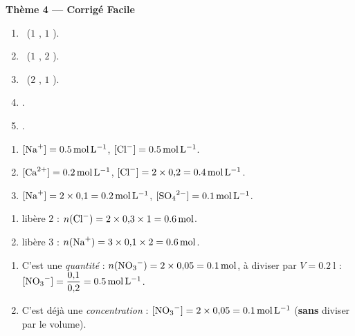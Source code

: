 \documentclass[11pt,a4paper]{article}
\begin{document}
\begin{center}{\large\bfseries\color{primarydark} Thème 4 — Corrigé Facile}\end{center}

\begin{corrige}
\begin{enumerate}[label=\alph*)]
  \item {} \ ($1$ , $1$ ).
  \item {} \ ($1$ , $2$ ).
  \item {} \ ($2$ , $1$ ).
  \item {}.
  \item {}.
\end{enumerate}
\end{corrige}

\begin{corrige}
\begin{enumerate}[label=\alph*)]
  \item $[\ce{Na+}] = \SI{0.5}{\mole\per\litre}$, $[\ce{Cl-}] = \SI{0.5}{\mole\per\litre}$.
  \item $[\ce{Ca^2+}] = \SI{0.2}{\mole\per\litre}$, $[\ce{Cl-}] = 2\times 0{,}2 = \SI{0.4}{\mole\per\litre}$.
  \item $[\ce{Na+}] = 2\times 0{,}1 = \SI{0.2}{\mole\per\litre}$, $[\ce{SO4^{2-}}] = \SI{0.1}{\mole\per\litre}$.
\end{enumerate}
\end{corrige}

\begin{corrige}
\begin{enumerate}[label=\alph*)]
  \item {} libère $2$  : $n(\ce{Cl-}) = 2\times 0{,}3\times 1 = \SI{0.6}{\mole}$.
  \item {} libère $3$  : $n(\ce{Na+}) = 3\times 0{,}1\times 2 = \SI{0.6}{\mole}$.
\end{enumerate}
\end{corrige}

\begin{corrige}
\begin{enumerate}[label=\alph*)]
  \item C'est une \emph{quantité} : $n(\ce{NO3-}) = 2\times 0{,}05 = \SI{0.1}{\mole}$, à diviser par
        $V = \SI{0.2}{\litre}$ : $[\ce{NO3-}] = \dfrac{0{,}1}{0{,}2} = \SI{0.5}{\mole\per\litre}$.
  \item C'est déjà une \emph{concentration} : $[\ce{NO3-}] = 2\times 0{,}05 = \SI{0.1}{\mole\per\litre}$
        (\textbf{sans} diviser par le volume).
\end{enumerate}
\end{corrige}
\end{document}
